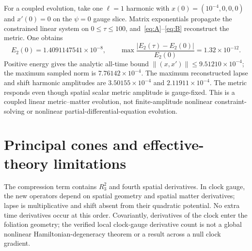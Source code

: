 \documentclass[11pt]{article}
\numberwithin{equation}{section}
\begin{document}
For a coupled evolution, take one $\ell=1$ harmonic with $x(0)=(10^{-4},0,0,0)$ and $x'(0)=0$ on the $\psi=0$ gauge slice.
Matrix exponentials propagate the constrained linear system on $0\le\tau\le100$, and~\eqref{eq:A}--\eqref{eq:B} reconstruct the metric.
One obtains
\begin{equation}
 E_2(0)=1.4091147541\times10^{-8},\qquad
 \max\frac{|E_2(\tau)-E_2(0)|}{E_2(0)}=1.32\times10^{-12}.
\end{equation}
Positive energy gives the analytic all-time bound $\|(x,x')\|\le9.51210\times10^{-4}$; the maximum sampled norm is $7.76142\times10^{-4}$.
The maximum reconstructed lapse and shift harmonic amplitudes are $3.50155\times10^{-4}$ and $2.11911\times10^{-4}$.
The metric responds even though spatial scalar metric amplitude is gauge-fixed.
This is a coupled linear metric--matter evolution, not finite-amplitude nonlinear constraint-solving or nonlinear partial-differential-equation evolution.

\section{Principal cones and effective-theory limitations}

The compression term contains $R_3^2$ and fourth spatial derivatives.
In clock gauge, the new operators depend on spatial geometry and spatial matter derivatives; lapse is multiplicative and shift absent from their quadratic potential.
No extra time derivatives occur at this order.
Covariantly, derivatives of the clock enter the foliation geometry; the verified local clock-gauge derivative count is not a global nonlinear Hamiltonian-degeneracy theorem or a result across a null clock gradient.
\end{document}
